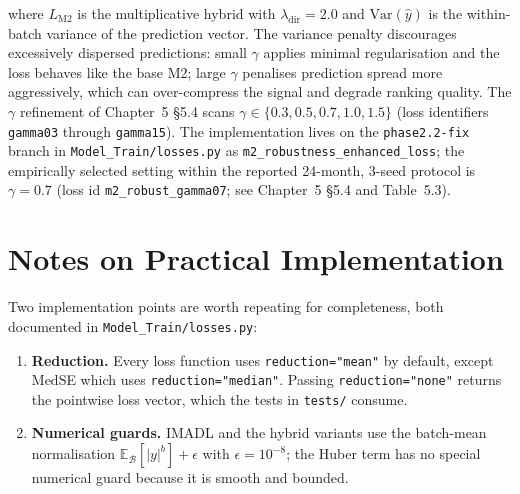 where $L_{\mathrm{M2}}$ is the multiplicative hybrid with $\lambda_{\mathrm{dir}} = 2.0$ and $\mathrm{Var}(\hat y)$ is the within-batch variance of the prediction vector. The variance penalty discourages excessively dispersed predictions: small $\gamma$ applies minimal regularisation and the loss behaves like the base M2; large $\gamma$ penalises prediction spread more aggressively, which can over-compress the signal and degrade ranking quality. The $\gamma$ refinement of Chapter~5 \S5.4 scans $\gamma \in \{0.3, 0.5, 0.7, 1.0, 1.5\}$ (loss identifiers \texttt{gamma03} through \texttt{gamma15}). The implementation lives on the \texttt{phase2.2-fix} branch in \texttt{Model\_Train/losses.py} as \texttt{m2\_robustness\_enhanced\_loss}; the empirically selected setting within the reported 24-month, 3-seed protocol is $\gamma = 0.7$ (loss id \texttt{m2\_robust\_gamma07}; see Chapter~5 \S5.4 and Table~5.3).

\section{Notes on Practical Implementation}

\label{sec:practical-notes}

Two implementation points are worth repeating for completeness, both documented in \texttt{Model\_Train/losses.py}:

\begin{enumerate}
    \item \textbf{Reduction.} Every loss function uses \texttt{reduction="mean"} by default, except MedSE which uses \texttt{reduction="median"}. Passing \texttt{reduction="none"} returns the pointwise loss vector, which the tests in \texttt{tests/} consume.
    \item \textbf{Numerical guards.} IMADL and the hybrid variants use the batch-mean normalisation $\mathbb{E}_{\mathcal{B}}[|y|^b] + \epsilon$ with $\epsilon = 10^{-8}$; the Huber term has no special numerical guard because it is smooth and bounded.
\end{enumerate}
